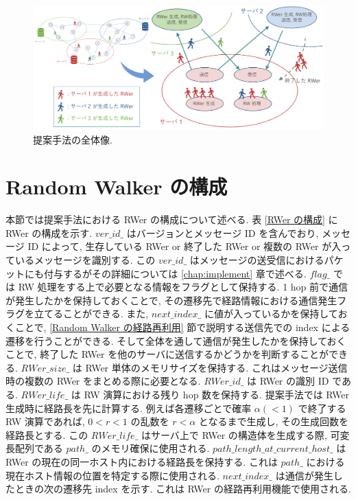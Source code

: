 \begin{figure}[t]
    \centering
    \includegraphics[scale=0.5]{figure/proposed.pdf}
    \caption{提案手法の全体像.}
    \label{提案手法の全体像}
\end{figure}

\section{Random Walker の構成}\label{Random Walker の構成}

本節では提案手法における RWer の構成について述べる. 表 \ref{RWer の構成} に RWer の構成を示す. $ver\_id\_$ はバージョンとメッセージ ID を含んでおり, メッセージ ID によって, 生存している RWer or 終了した RWer or 複数の RWer が入っているメッセージを識別する. この $ver\_id\_$ はメッセージの送受信におけるパケットにも付与するがその詳細については \ref{chap:implement} 章で述べる. $flag\_$ では RW 処理をする上で必要となる情報をフラグとして保持する. 1 hop 前で通信が発生したかを保持しておくことで, その遷移先で経路情報における通信発生フラグを立てることができる. また, $next\_index\_$ に値が入っているかを保持しておくことで, \ref{Random Walker の経路再利用} 節で説明する送信先での index による遷移を行うことができる. そして全体を通して通信が発生したかを保持しておくことで, 終了した RWer を他のサーバに送信するかどうかを判断することができる. $RWer\_size\_$ は RWer 単体のメモリサイズを保持する. これはメッセージ送信時の複数の RWer をまとめる際に必要となる. $RWer\_id\_$ は RWer の識別 ID である. $RWer\_life\_$ は RW 演算における残り hop 数を保持する. 提案手法では RWer 生成時に経路長を先に計算する. 例えば各遷移ごとで確率 $\alpha (< 1)$ で終了する RW 演算であれば, $0 < r < 1$ の乱数を $r < \alpha$ となるまで生成し, その生成回数を経路長とする. この $RWer\_life\_$ はサーバ上で RWer の構造体を生成する際, 可変長配列である $path\_$ のメモリ確保に使用される. $path\_length\_at\_current\_host\_$ は RWer の現在の同一ホスト内における経路長を保持する. これは $path\_$ における現在ホスト情報の位置を特定する際に使用される. $next\_index\_$ は通信が発生したときの次の遷移先 index を示す. これは RWer の経路再利用機能で使用される. 

